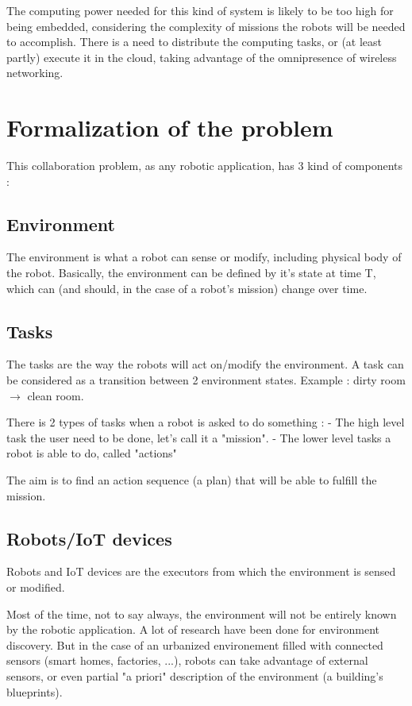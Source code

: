 \documentclass[conference]{IEEEtran}
\begin{document}
The computing power needed for this kind of system is likely to be too high for being embedded, considering the complexity of missions the robots will be needed to accomplish.
There is a need to distribute the computing tasks, or (at least partly) execute it in the cloud, taking advantage of the omnipresence of wireless networking.

\section{Formalization of the problem}

This collaboration problem, as any robotic application, has 3 kind of components : 

\subsection{Environment}

The environment is what a robot can sense or modify, including physical body of the robot.
Basically, the environment can be defined by it's state at time T, which can (and should, in the case of a robot's mission) change over time.

\subsection{Tasks}

The tasks are the way the robots will act on/modify the environment.
A task can be considered as a transition between 2 environment states.
Example : dirty room $\rightarrow$ clean room.

There is 2 types of tasks when a robot is asked to do something : 
 - The high level task the user need to be done, let's call it a "mission".
 - The lower level tasks a robot is able to do, called "actions"

The aim is to find an action sequence (a plan) that will be able to fulfill the mission.

\subsection{Robots/IoT devices}

Robots and IoT devices are the executors from which the environment is sensed or modified.

Most of the time, not to say always, the environment will not be entirely known by the robotic application.
A lot of research have been done for environment discovery.
But in the case of an urbanized environement filled with connected sensors (smart homes, factories, ...), robots can take advantage of external sensors, or even partial "a priori" description of the environment (a building's blueprints).
\end{document}
